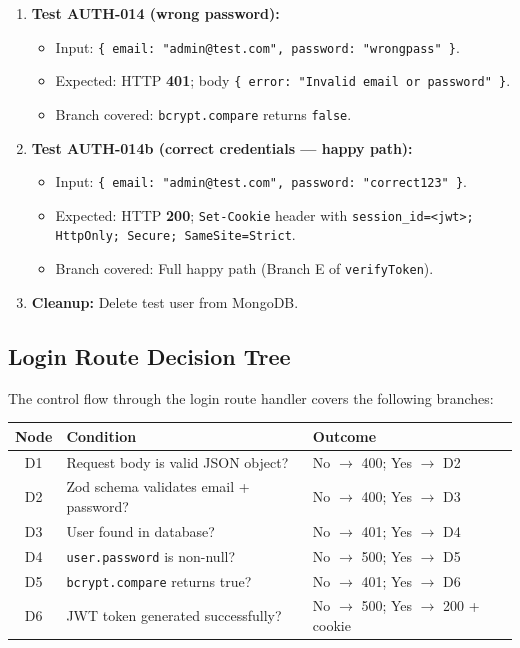 \documentclass[12pt,a4paper]{report}
\begin{document}
\begin{enumerate}
    \item \textbf{Test AUTH-014 (wrong password):}
    \begin{itemize}
        \item Input: \texttt{\{ email: "admin@test.com", password: "wrongpass" \}}.
        \item Expected: HTTP \textbf{401}; body \texttt{\{ error: "Invalid email or password" \}}.
        \item Branch covered: \texttt{bcrypt.compare} returns \texttt{false}.
    \end{itemize}

    \item \textbf{Test AUTH-014b (correct credentials --- happy path):}
    \begin{itemize}
        \item Input: \texttt{\{ email: "admin@test.com", password: "correct123" \}}.
        \item Expected: HTTP \textbf{200}; \texttt{Set-Cookie} header with \texttt{session\_id=<jwt>; HttpOnly; Secure; SameSite=Strict}.
        \item Branch covered: Full happy path (Branch E of \texttt{verifyToken}).
    \end{itemize}

    \item \textbf{Cleanup:} Delete test user from MongoDB.
\end{enumerate}

\subsection{Login Route Decision Tree}

The control flow through the login route handler covers the following branches:

\begin{center}
\begin{tabular}{clp{7cm}}
    \toprule
    \textbf{Node} & \textbf{Condition} & \textbf{Outcome} \\
    \midrule
    D1 & Request body is valid JSON object? & No $\to$ 400; Yes $\to$ D2 \\
    D2 & Zod schema validates email + password? & No $\to$ 400; Yes $\to$ D3 \\
    D3 & User found in database? & No $\to$ 401; Yes $\to$ D4 \\
    D4 & \texttt{user.password} is non-null? & No $\to$ 500; Yes $\to$ D5 \\
    D5 & \texttt{bcrypt.compare} returns true? & No $\to$ 401; Yes $\to$ D6 \\
    D6 & JWT token generated successfully? & No $\to$ 500; Yes $\to$ 200 + cookie \\
    \bottomrule
\end{tabular}
\end{center}
\end{document}
